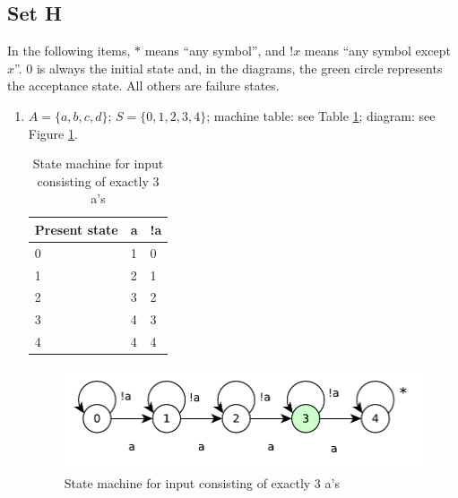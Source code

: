 \subsection{Set H}
In the following items, $*$ means ``any symbol'', and $!x$ means ``any symbol except $x$''. $0$ is always the initial state and, in the diagrams, the green circle represents the acceptance state. All others are failure states.
\begin{enumerate}
    \item $A = \{a, b, c, d\}$; $S = \{0, 1, 2, 3, 4\}$; machine table: see Table \ref{tab:machine-3as}; diagram: see Figure \ref{fig:threeas}.
    \begin{table}[!ht]
        \centering
        \begin{tabular}{l|ll}
        Present state & a & !a \\ \hline
        0             & 1 & 0  \\
        1             & 2 & 1  \\
        2             & 3 & 2  \\
        3             & 4 & 3  \\
        4             & 4 & 4 
        \end{tabular}
        \caption{State machine for input consisting of exactly 3 a's}
        \label{tab:machine-3as}
    \end{table}
    \begin{figure}[!ht]
        \centering
        \includegraphics[scale=0.5]{diagrams/threeas.pdf}
        \caption{State machine for input consisting of exactly 3 a's}
        \label{fig:threeas}
    \end{figure}
    

\end{enumerate}
